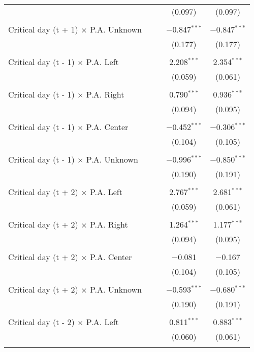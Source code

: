 \documentclass[
]{article}
\begin{document}
\begin{table}[!htbp]
{\begin{tabular}{@{\extracolsep{5pt}}lcccc}
  &  &  & (0.097) & (0.097) \\ 
  & & & & \\ 
 Critical day (t + 1) $\times$ P.A. Unknown &  &  & $-$0.847$^{***}$ & $-$0.847$^{***}$ \\ 
  &  &  & (0.177) & (0.177) \\ 
  & & & & \\ 
 Critical day (t - 1) $\times$ P.A. Left &  &  & 2.208$^{***}$ & 2.354$^{***}$ \\ 
  &  &  & (0.059) & (0.061) \\ 
  & & & & \\ 
 Critical day (t - 1) $\times$ P.A. Right &  &  & 0.790$^{***}$ & 0.936$^{***}$ \\ 
  &  &  & (0.094) & (0.095) \\ 
  & & & & \\ 
 Critical day (t - 1) $\times$ P.A. Center &  &  & $-$0.452$^{***}$ & $-$0.306$^{***}$ \\ 
  &  &  & (0.104) & (0.105) \\ 
  & & & & \\ 
 Critical day (t - 1) $\times$ P.A. Unknown &  &  & $-$0.996$^{***}$ & $-$0.850$^{***}$ \\ 
  &  &  & (0.190) & (0.191) \\ 
  & & & & \\ 
 Critical day (t + 2) $\times$ P.A. Left &  &  & 2.767$^{***}$ & 2.681$^{***}$ \\ 
  &  &  & (0.059) & (0.061) \\ 
  & & & & \\ 
 Critical day (t + 2) $\times$ P.A. Right &  &  & 1.264$^{***}$ & 1.177$^{***}$ \\ 
  &  &  & (0.094) & (0.095) \\ 
  & & & & \\ 
 Critical day (t + 2) $\times$ P.A. Center &  &  & $-$0.081 & $-$0.167 \\ 
  &  &  & (0.104) & (0.105) \\ 
  & & & & \\ 
 Critical day (t + 2) $\times$ P.A. Unknown &  &  & $-$0.593$^{***}$ & $-$0.680$^{***}$ \\ 
  &  &  & (0.190) & (0.191) \\ 
  & & & & \\ 
 Critical day (t - 2) $\times$ P.A. Left &  &  & 0.811$^{***}$ & 0.883$^{***}$ \\ 
  &  &  & (0.060) & (0.061) \\ 
  & & & & \\ 

\end{tabular}}
\end{table}
\end{document}
